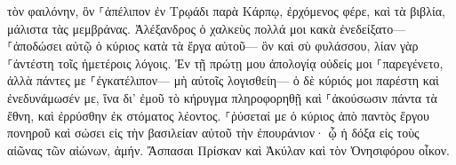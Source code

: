 \documentclass{openreader}
\begin{document}
τὸν φαιλόνην, ὃν ⸀ἀπέλιπον ἐν Τρῳάδι παρὰ Κάρπῳ, ἐρχόμενος φέρε, καὶ τὰ βιβλία, μάλιστα τὰς μεμβράνας. 
Ἀλέξανδρος ὁ χαλκεὺς πολλά μοι κακὰ ἐνεδείξατο— ⸀ἀποδώσει αὐτῷ ὁ κύριος κατὰ τὰ ἔργα αὐτοῦ— 
ὃν καὶ σὺ φυλάσσου, λίαν γὰρ ⸀ἀντέστη τοῖς ἡμετέροις λόγοις. 
Ἐν τῇ πρώτῃ μου ἀπολογίᾳ οὐδείς μοι ⸀παρεγένετο, ἀλλὰ πάντες με ⸀ἐγκατέλιπον— μὴ αὐτοῖς λογισθείη— 
ὁ δὲ κύριός μοι παρέστη καὶ ἐνεδυνάμωσέν με, ἵνα δι’ ἐμοῦ τὸ κήρυγμα πληροφορηθῇ καὶ ⸀ἀκούσωσιν πάντα τὰ ἔθνη, καὶ ἐρρύσθην ἐκ στόματος λέοντος. 
⸀ῥύσεταί με ὁ κύριος ἀπὸ παντὸς ἔργου πονηροῦ καὶ σώσει εἰς τὴν βασιλείαν αὐτοῦ τὴν ἐπουράνιον· ᾧ ἡ δόξα εἰς τοὺς αἰῶνας τῶν αἰώνων, ἀμήν. 
Ἄσπασαι Πρίσκαν καὶ Ἀκύλαν καὶ τὸν Ὀνησιφόρου οἶκον. 
\end{document}
